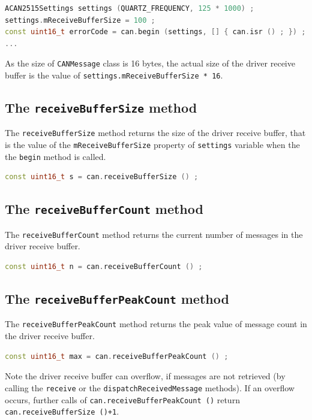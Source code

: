 \documentclass[9pt, a4paper, obeyspaces]{extarticle}
\begin{document}
{ \small\begin{lstlisting}[language=c++]
ACAN2515Settings settings (QUARTZ_FREQUENCY, 125 * 1000) ;
settings.mReceiveBufferSize = 100 ;
const uint16_t errorCode = can.begin (settings, [] { can.isr () ; }) ;
...
\end{lstlisting}}

As the size of \texttt{CANMessage} class is 16 bytes, the actual size of the driver receive buffer is the value of \texttt{settings.mReceiveBufferSize * 16}.


\subsection{The \texttt{receiveBufferSize} method}

The \texttt{receiveBufferSize} method returns the size of the driver receive buffer, that is the value of the \texttt{mReceiveBufferSize} property of \texttt{settings} variable when the the \texttt{begin} method is called.
{ \small\begin{lstlisting}[language=c++]
const uint16_t s = can.receiveBufferSize () ;
\end{lstlisting}}


\subsection{The \texttt{receiveBufferCount} method}

The \texttt{receiveBufferCount} method returns the current number of messages in the driver receive buffer.
{ \small\begin{lstlisting}[language=c++]
const uint16_t n = can.receiveBufferCount () ;
\end{lstlisting}}


\subsection{The \texttt{receiveBufferPeakCount} method}

The \texttt{receiveBufferPeakCount} method returns the peak value of message count in the driver receive buffer.
{ \small\begin{lstlisting}[language=c++]
const uint16_t max = can.receiveBufferPeakCount () ;
\end{lstlisting}}

Note the driver receive buffer can overflow, if messages are not retrieved (by calling the \texttt{receive} or the \texttt{dispatchReceivedMessage} methods). If an overflow occurs, further calls of \texttt{can.receiveBufferPeakCount ()} return \texttt{can.receiveBufferSize ()+1}.
\end{document}
